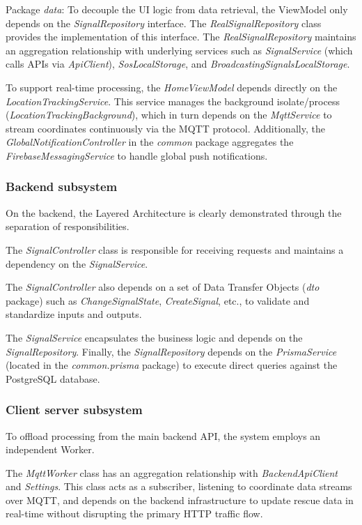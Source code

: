 \documentclass[../Main.tex]{subfiles}
\begin{document}
Package \textit{data}: To decouple the UI logic from data retrieval, the ViewModel only depends on the \textit{SignalRepository} interface. The \textit{RealSignalRepository} class provides the implementation of this interface. The \textit{RealSignalRepository} maintains an aggregation relationship with underlying services such as \textit{SignalService} (which calls APIs via \textit{ApiClient}), \textit{SosLocalStorage}, and \textit{BroadcastingSignalsLocalStorage}.

To support real-time processing, the \textit{HomeViewModel} depends directly on the \textit{LocationTrackingService}. This service manages the background isolate/process (\textit{LocationTrackingBackground}), which in turn depends on the \textit{MqttService} to stream coordinates continuously via the MQTT protocol. Additionally, the \textit{GlobalNotificationController} in the \textit{common} package aggregates the \textit{FirebaseMessagingService} to handle global push notifications.

\subsubsection{Backend subsystem}

On the backend, the Layered Architecture is clearly demonstrated through the separation of responsibilities.

The \textit{SignalController} class is responsible for receiving requests and maintains a dependency on the \textit{SignalService}.

The \textit{SignalController} also depends on a set of Data Transfer Objects (\textit{dto} package) such as \textit{ChangeSignalState}, \textit{CreateSignal}, etc., to validate and standardize inputs and outputs.

The \textit{SignalService} encapsulates the business logic and depends on the \textit{SignalRepository}. Finally, the \textit{SignalRepository} depends on the \textit{PrismaService} (located in the \textit{common.prisma} package) to execute direct queries against the PostgreSQL database.

\subsubsection{Client server subsystem}

To offload processing from the main backend API, the system employs an independent Worker.

The \textit{MqttWorker} class has an aggregation relationship with \textit{BackendApiClient} and \textit{Settings}. This class acts as a subscriber, listening to coordinate data streams over MQTT, and depends on the backend infrastructure to update rescue data in real-time without disrupting the primary HTTP traffic flow.
\end{document}
